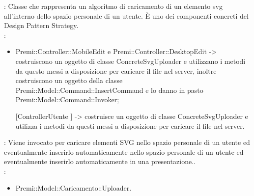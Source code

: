 {{{{{				\textbf{\tipo}: Classe che rappresenta un algoritmo di caricamento di un elemento svg all’interno dello spazio personale di un utente.
È uno dei componenti concreti del Design Pattern Strategy.\\	
				\textbf{\relaz}: 
				\begin{itemize}
					\item Premi::Controller::MobileEdit e Premi::Controller::DesktopEdit -> costruiscono un oggetto di classe ConcreteSvgUploader e utilizzano i metodi da questo messi a disposizione per caricare il file nel server, inoltre costruiscono un oggetto della classe Premi::Model::Command::InsertCommand e lo danno in pasto Premi::Model::Command::Invoker;
                    \item [[ControllerUtente]] -> costruisce un oggetto di classe ConcreteSvgUploader e utilizza i metodi da questi messi a disposizione per caricare il file nel server.
				\end{itemize} 
				\textbf{\interfacce}: Viene invocato per caricare elementi SVG nello spazio personale di un utente ed eventualmente inserirlo automaticamente nello spazio personale di un utente ed eventualmente inserirlo automaticamente in una presentazione..\\
                \textbf{\base}: 
                    \begin{itemize}
                    \item Premi::Model::Caricamento::Uploader.
                    \end{itemize}
			}
       }}}}
